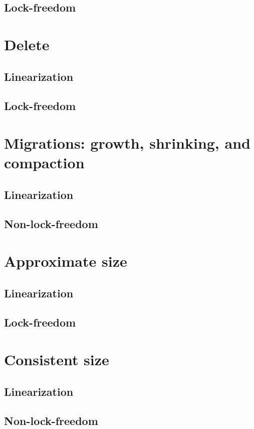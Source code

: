 \subsection{Lock-freedom}

\section{Delete}
\subsection{Linearization}
\subsection{Lock-freedom}

\section{Migrations: growth, shrinking, and compaction}
\subsection{Linearization}
\subsection{Non-lock-freedom}

\section{Approximate size}
\subsection{Linearization}
\subsection{Lock-freedom}

\section{Consistent size}
\subsection{Linearization}
\subsection{Non-lock-freedom}

